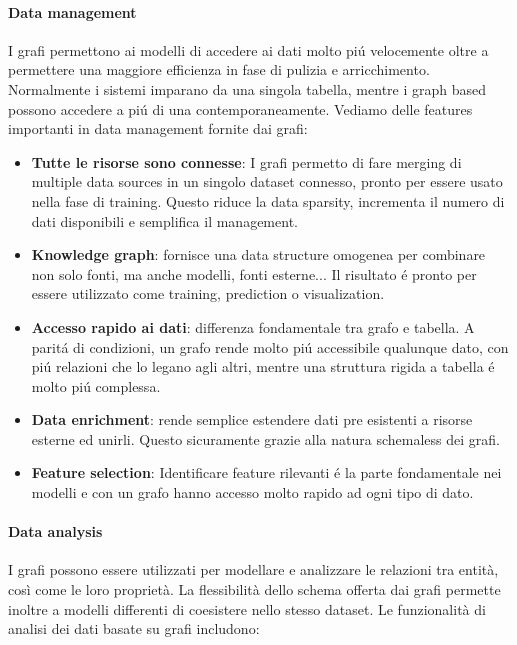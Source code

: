 \paragraph{Data management} I grafi permettono ai modelli di accedere ai dati molto piú velocemente oltre a permettere una maggiore efficienza in fase di pulizia e arricchimento. Normalmente i sistemi imparano da una singola tabella, mentre i graph based possono accedere a piú di una contemporaneamente. Vediamo delle features importanti in data management fornite dai grafi: 
\begin{itemize}
    \item \textbf{Tutte le risorse sono connesse}: I grafi permetto di fare merging di multiple data sources in un singolo dataset connesso, pronto per essere usato nella fase di training. Questo riduce la data sparsity, incrementa il numero di dati disponibili e semplifica il management. 
    \item \textbf{Knowledge graph}: fornisce una data structure omogenea per combinare non solo fonti, ma anche modelli, fonti esterne... Il risultato é pronto per essere utilizzato come training, prediction o visualization. 
    \item \textbf{Accesso rapido ai dati}: differenza fondamentale tra grafo e tabella. A paritá di condizioni, un grafo rende molto piú accessibile qualunque dato, con piú relazioni che lo legano agli altri, mentre una struttura rigida a tabella é molto piú complessa.
    \item \textbf{Data enrichment}: rende semplice estendere dati pre esistenti a risorse esterne ed unirli. Questo sicuramente grazie alla natura schemaless dei grafi. 
    \item \textbf{Feature selection}: Identificare feature rilevanti é la parte fondamentale nei modelli e con un grafo hanno accesso molto rapido ad ogni tipo di dato.
\end{itemize}

\paragraph{Data analysis} I grafi possono essere utilizzati per modellare e analizzare le relazioni tra entità, così come le loro proprietà. La flessibilità dello schema offerta dai grafi permette inoltre a modelli differenti di coesistere nello stesso dataset. Le funzionalità di analisi dei dati basate su grafi includono:

